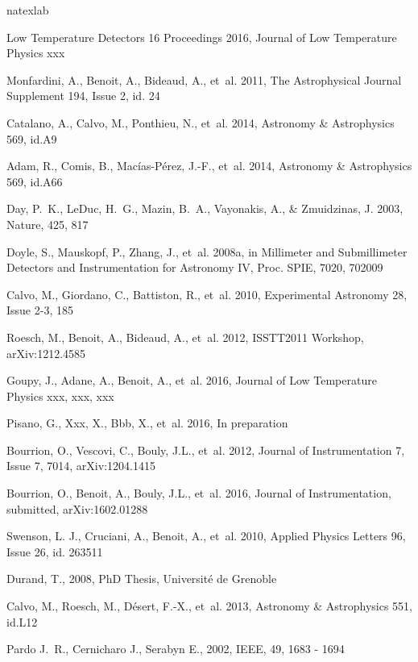 \documentclass[]{aa} %
\begin{document}
\begin{thebibliography}{16}
\expandafter\ifx\csname natexlab\endcsname\relax\def\natexlab#1{#1}\fi

Low Temperature Detectors 16 Proceedings 2016,  Journal of Low
  Temperature Physics xxx

Monfardini, A., Benoit, A., Bideaud, A., {et~al.} 2011, 
The Astrophysical Journal Supplement 194, Issue 2, id. 24

Catalano, A., Calvo, M., Ponthieu, N., {et~al.} 2014, 
Astronomy \& Astrophysics 569, id.A9

Adam, R., Comis, B., Mac\'ias-P\'erez, J.-F., {et~al.} 2014, 
Astronomy \& Astrophysics 569, id.A66

Day, P.~K., LeDuc, H.~G., Mazin, B.~A., Vayonakis, A., \& Zmuidzinas, J. 2003,
  Nature, 425, 817

Doyle, S., Mauskopf, P., Zhang, J., {et~al.} 2008{\natexlab{a}}, in Millimeter
  and Submillimeter Detectors and Instrumentation for Astronomy IV, Proc. SPIE,
  7020, 702009

Calvo, M., Giordano, C., Battiston, R., {et~al.} 2010, 
Experimental Astronomy 28, Issue 2-3, 185

Roesch, M., Benoit, A., Bideaud, A., {et~al.} 2012, 
ISSTT2011 Workshop, arXiv:1212.4585

Goupy, J., Adane, A., Benoit, A., {et~al.} 2016, 
Journal of Low Temperature Physics xxx, xxx, xxx

Pisano, G., Xxx, X., Bbb, X., {et~al.} 2016, 
In preparation

Bourrion, O., Vescovi, C., Bouly, J.L., {et~al.} 2012, 
Journal of Instrumentation 7, Issue 7, 7014, arXiv:1204.1415

Bourrion, O., Benoit, A., Bouly, J.L., {et~al.} 2016, 
Journal of Instrumentation, submitted, arXiv:1602.01288

Swenson, L. J., Cruciani, A., Benoit, A., {et~al.} 2010, 
Applied Physics Letters 96, Issue 26, id. 263511

Durand, T., 2008, 
PhD Thesis, Universit\' e de Grenoble

Calvo, M., Roesch, M., D\'esert, F.-X., {et~al.} 2013, 
Astronomy \& Astrophysics 551, id.L12

Pardo J.~R., Cernicharo J., Serabyn E., 2002, 
IEEE, 49, 1683 - 1694


\end{thebibliography}

%
% 
\end{document}

